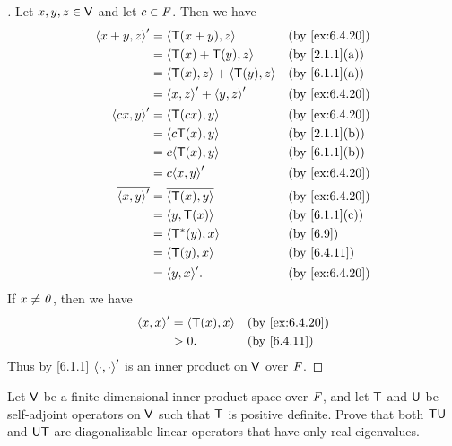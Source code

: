 \begin{proof}[]
	Let \(x, y, z \in \mathsf{V}\) and let \(c \in \mathit{F}\).
	Then we have
	\begin{align*}
		\inn{x + y, z}'    & = \inn{\T(x + y), z}              &  & \by{ex:6.4.20} \\
		                   & = \inn{\T(x) + \T(y), z}          &  & \by{2.1.1}[a]  \\
		                   & = \inn{\T(x), z} + \inn{\T(y), z} &  & \by{6.1.1}[a]  \\
		                   & = \inn{x, z}' + \inn{y, z}'       &  & \by{ex:6.4.20} \\
		\inn{cx, y}'       & = \inn{\T(cx), y}                 &  & \by{ex:6.4.20} \\
		                   & = \inn{c \T(x), y}                &  & \by{2.1.1}[b]  \\
		                   & = c \inn{\T(x), y}                &  & \by{6.1.1}[b]  \\
		                   & = c \inn{x, y}'                   &  & \by{ex:6.4.20} \\
		\conj{\inn{x, y}'} & = \conj{\inn{\T(x), y}}           &  & \by{ex:6.4.20} \\
		                   & = \inn{y, \T(x)}                  &  & \by{6.1.1}[c]  \\
		                   & = \inn{\T^*(y), x}                &  & \by{6.9}       \\
		                   & = \inn{\T(y), x}                  &  & \by{6.4.11}    \\
		                   & = \inn{y, x}'.                    &  & \by{ex:6.4.20}
	\end{align*}
	If \(x \neq \mathit{0}\), then we have
	\begin{align*}
		\inn{x, x}' & = \inn{\T(x), x} &  & \by{ex:6.4.20} \\
		            & > 0.             &  & \by{6.4.11}
	\end{align*}
	Thus by \cref{6.1.1} \(\left\langle\cdot, \cdot\right\rangle'\) is an inner product on \(\mathsf{V}\) over \(\mathit{F}\).
\end{proof}

\begin{ex}\label{ex:6.4.21}
	Let \(\mathsf{V}\) be a finite-dimensional inner product space over \(\mathit{F}\), and let \(\mathsf{T}\) and \(\mathsf{U}\) be self-adjoint operators on \(\mathsf{V}\) such that \(\mathsf{T}\) is positive definite.
	Prove that both \(\mathsf{T} \mathsf{U}\) and \(\mathsf{U} \mathsf{T}\) are diagonalizable linear operators that have only real eigenvalues.
\end{ex}

